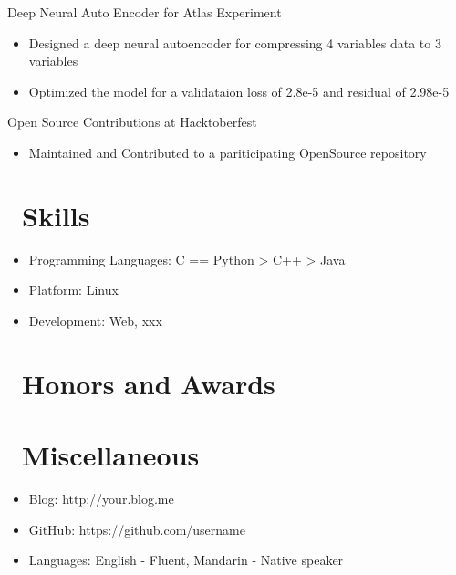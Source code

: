 \documentclass{resume}
\begin{document}
Deep Neural Auto Encoder for Atlas Experiment
\begin{itemize}
  \item Designed a deep neural autoencoder for compressing 4 variables data to 3 variables
  \item Optimized the model for a validataion loss of 2.8e-5 and residual of 2.98e-5
\end{itemize}

Open Source Contributions at Hacktoberfest
\begin{itemize}
\item Maintained and Contributed to a pariticipating OpenSource repository  
\end{itemize}



\section{\faCogs\ Skills}
\begin{itemize}[parsep=0.5ex]
  \item Programming Languages: C == Python > C++ > Java
  \item Platform: Linux
  \item Development: Web, xxx
\end{itemize}

\section{\faHeartO\ Honors and Awards}

\section{\faInfo\ Miscellaneous}
\begin{itemize}[parsep=0.5ex]
  \item Blog: http://your.blog.me
  \item GitHub: https://github.com/username
  \item Languages: English - Fluent, Mandarin - Native speaker
\end{itemize}

%
%
\end{document}
